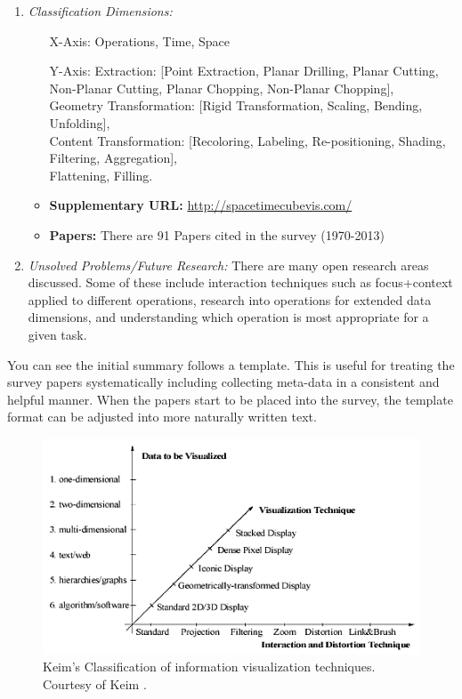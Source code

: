 \begin{footnotesize}
\begin{enumerate}
\item \textit{Classification Dimensions:}
\begin{itemize}
\item[X-Axis:] Operations, Time, Space
\item[Y-Axis:] Extraction: [Point Extraction, Planar Drilling, Planar Cutting, Non-Planar Cutting, Planar Chopping, Non-Planar Chopping],\\
Geometry Transformation: [Rigid Transformation, Scaling, Bending, Unfolding],\\ 
Content Transformation: [Recoloring, Labeling, Re-positioning, Shading, Filtering, Aggregation],\\
Flattening, Filling.
\item \textbf{Supplementary URL:} \url{http://spacetimecubevis.com/}
\item \textbf{Papers:} There are 91 Papers cited in the survey (1970-2013)\\
\end{itemize}

\item \textit{Unsolved Problems/Future Research:}
There are many open research areas discussed. Some of these include interaction techniques such as focus+context applied to different operations, research into operations for extended data dimensions, and understanding which operation is most appropriate for a given task.

\end{enumerate}
\end{footnotesize}

You can see the initial summary follows a template. This is useful for treating the survey papers systematically including collecting meta-data in a consistent and helpful manner. When the papers start to be placed into the survey, the template format can be adjusted into  more naturally written text.

\begin{figure}
\centering
\includegraphics[width=0.7\linewidth]{pictures/techniquetaxonomy.png}
\caption{Keim's 
Classification of information visualization techniques. Courtesy of Keim \cite{keim2002information}. } \label{fig:keim}
\end{figure} 


